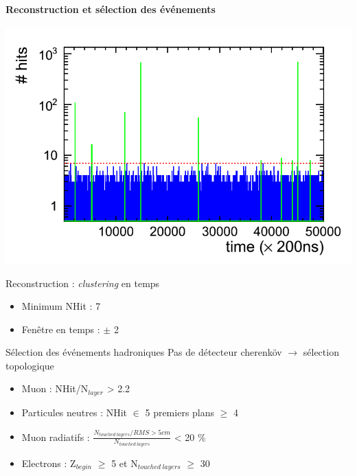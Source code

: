 \documentclass[8pt]{beamer}
\begin{document}
  \begin{frame}
  \frametitle{\secname}
  \framesubtitle{Reconstruction et sélection des événements}
    \begin{minipage}{0.4\linewidth}
      \includegraphics[width=\linewidth]{sdhcal_time_spectrum.png}
    \end{minipage} \hfill
    \begin{minipage}{0.58\linewidth}
      \begin{block}{Reconstruction : \textit{clustering} en temps}
        \begin{itemize}
          \item Minimum NHit : 7
          \item Fenêtre en temps : $\pm$ 2
        \end{itemize}
      \end{block}
    \end{minipage}
    \pause
    \begin{minipage}{0.6\linewidth}
      \begin{block}{Sélection des événements hadroniques}
      Pas de détecteur cherenköv $\rightarrow$ sélection topologique
        \begin{itemize}
          \item Muon : NHit/N$_{layer}$ > 2.2
          \item Particules neutres : NHit $\in$ 5 premiers plans $\geq$ 4
          \item Muon radiatifs : $\frac{N_{touched~layers}/RMS>5cm}{N_{touched~layers}}$ < 20 \%
          \item Electrons : Z$_{begin}$ $\geq$ 5 et N$_{touched~layers}$ $\geq$ 30
        \end{itemize}

\end{block}
\end{minipage}
\end{frame}
\end{document}
